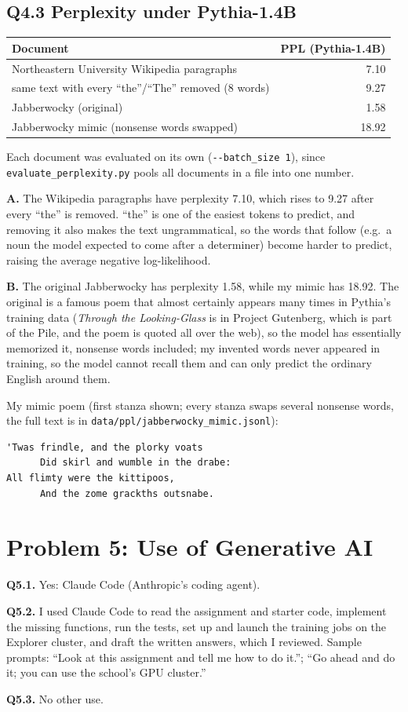 \documentclass[11pt]{article}
\begin{document}
\subsection*{Q4.3 Perplexity under Pythia-1.4B}
\begin{center}
\begin{tabular}{lr}
\toprule
Document & PPL (Pythia-1.4B) \\
\midrule
Northeastern University Wikipedia paragraphs & 7.10 \\
\quad same text with every ``the''/``The'' removed (8 words) & 9.27 \\
Jabberwocky (original) & 1.58 \\
Jabberwocky mimic (nonsense words swapped) & 18.92 \\
\bottomrule
\end{tabular}
\end{center}
Each document was evaluated on its own (\texttt{-{}-batch\_size 1}), since \texttt{evaluate\_perplexity.py} pools all documents in a file into one number.

\textbf{A.} The Wikipedia paragraphs have perplexity 7.10, which rises to 9.27 after every ``the'' is removed. ``the'' is one of the easiest tokens to predict, and removing it also makes the text ungrammatical, so the words that follow (e.g.\ a noun the model expected to come after a determiner) become harder to predict, raising the average negative log-likelihood.

\textbf{B.} The original Jabberwocky has perplexity 1.58, while my mimic has 18.92. The original is a famous poem that almost certainly appears many times in Pythia's training data (\emph{Through the Looking-Glass} is in Project Gutenberg, which is part of the Pile, and the poem is quoted all over the web), so the model has essentially memorized it, nonsense words included; my invented words never appeared in training, so the model cannot recall them and can only predict the ordinary English around them.

My mimic poem (first stanza shown; every stanza swaps several nonsense words, the full text is in \texttt{data/ppl/jabberwocky\_mimic.jsonl}):
\begin{lstlisting}
'Twas frindle, and the plorky voats
      Did skirl and wumble in the drabe:
All flimty were the kittipoos,
      And the zome grackths outsnabe.
\end{lstlisting}

\section*{Problem 5: Use of Generative AI}
\textbf{Q5.1.} Yes: Claude Code (Anthropic's coding agent).

\textbf{Q5.2.} I used Claude Code to read the assignment and starter code, implement the missing functions, run the tests, set up and launch the training jobs on the Explorer cluster, and draft the written answers, which I reviewed. Sample prompts: ``Look at this assignment and tell me how to do it.''; ``Go ahead and do it; you can use the school's GPU cluster.''

\textbf{Q5.3.} No other use.
\end{document}
